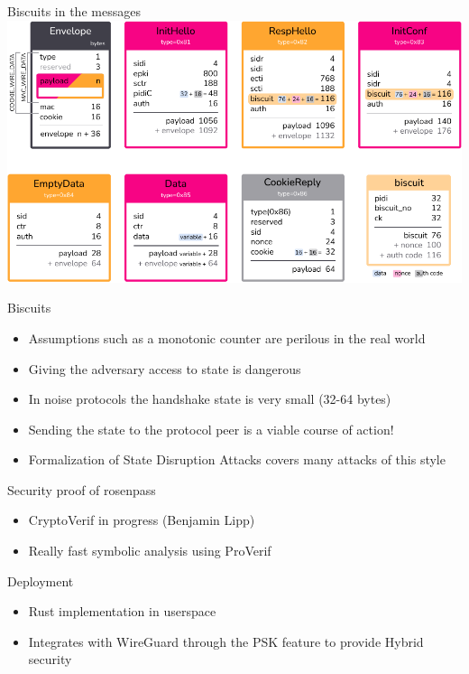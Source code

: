 \begin{frame}{Biscuits in the messages}
  \includegraphics[height=.80\textheight]{graphics/rosenpass-wp-message-types-rgb.pdf}
\end{frame}

\begin{frame}{Biscuits}
  \begin{itemize}
	\item Assumptions such as a monotonic counter are perilous in the real world
	\item Giving the adversary access to state is dangerous
	\item In noise protocols the handshake state is very small (32-64 bytes)
	\item Sending the state to the protocol peer is a viable course of action!
	\item Formalization of State Disruption Attacks covers many attacks of this style
  \end{itemize}
\end{frame}

\begin{frame}{Security proof of rosenpass}
  \begin{itemize}
	\item CryptoVerif in progress (Benjamin Lipp)
	\item Really fast symbolic analysis using ProVerif
  \end{itemize}
\end{frame}

\begin{frame}{Deployment}
  \begin{itemize}
	\item Rust implementation in userspace
	\item Integrates with WireGuard through the PSK feature to provide Hybrid security
  \end{itemize}
\end{frame}


